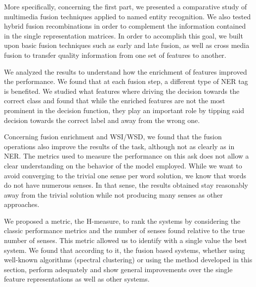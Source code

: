 More specifically, concerning the first part, we presented  a comparative study of multimedia fusion techniques applied to named entity recognition.  We also tested hybrid fusion recombinations in order to complement the information contained in the single representation matrices. In order to accomplish this goal, we built upon basic fusion techniques such as early and late fusion, as well as cross media fusion to transfer quality information from one set of features to another. 


We analyzed the results to understand how the enrichment of features improved the performance. We found that at each fusion step, a different type of NER tag is benefited. We studied what features where driving the decision towards the correct class and found that while the enriched features are not the most prominent  in the decision function, they play an important role by tipping said decision towards the correct label and away from the wrong one. 

Concerning fusion enrichment and WSI/WSD, we found that the fusion operations also improve the results of the task, although not as clearly as in NER. The metrics used to measure the performance on this ask does not allow a clear understanding on the behavior of the model employed. While we want to avoid converging to the trivial one sense per word solution, we know that words do not have numerous senses. In that sense, the results obtained stay reasonably away from the trivial solution while not producing many senses as other approaches.

We proposed a metric, the H-measure, to rank the systems by considering the classic performance metrics and the number of senses found relative to the true number of senses. This metric allowed us to identify with a single value the best system. We found that according to it, the fusion based systems, whether using well-known algorithms (spectral clustering) or using the method developed in this section, perform adequately and show general improvements over the single feature representations as well as other systems.

